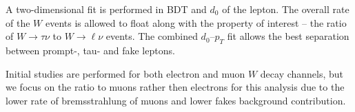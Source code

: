 A two-dimensional fit is performed in BDT and $d_0$ of the lepton.
The overall rate of the $W$ events is allowed to float along with the property of interest -- the ratio of $W \to \tau\nu$ to $W \to \ell\nu$ events.
The combined $d_0$--$p_T$ fit allows the best separation between prompt-, tau- and fake leptons.

Initial studies are performed for both electron and muon $W$ decay channels, but we focus on the ratio to muons rather then electrons for this analysis due to the lower rate of bremsstrahlung of muons and lower fakes background contribution.